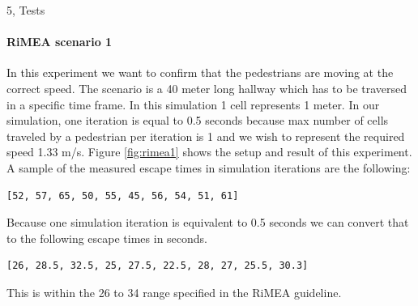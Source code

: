 \begin{task}{5, Tests}
\paragraph{RiMEA scenario 1}
In this experiment we want to confirm that the pedestrians are moving at the correct speed. The scenario is a 40 meter long hallway which has to be traversed in a specific time frame. In this simulation 1 cell represents 1 meter. In our simulation, one iteration is equal to 0.5 seconds because max number of cells traveled by a pedestrian per iteration is 1 and we wish to represent the required speed 1.33 m/s. Figure \ref{fig:rimea1} shows the setup and result of this experiment. A sample of the measured escape times in simulation iterations are the following:
\begin{verbatim}
[52, 57, 65, 50, 55, 45, 56, 54, 51, 61]
\end{verbatim}
Because one simulation iteration is equivalent to 0.5 seconds we can convert that to the following escape times in seconds.
\begin{verbatim}
[26, 28.5, 32.5, 25, 27.5, 22.5, 28, 27, 25.5, 30.3]
\end{verbatim}
This is within the 26 to 34 range specified in the RiMEA guideline.
\begin{figure}[H]
\centering
{}
\end{figure}
\end{task}
